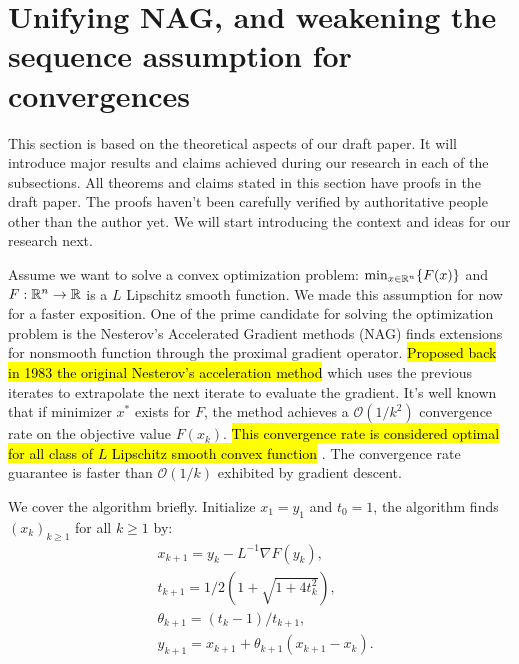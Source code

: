 \documentclass[12pt]{article}
\begin{document}
\section{Unifying NAG, and weakening the sequence assumption for convergences}\label{sec:unify-nes-acceleration}
    This section is based on the theoretical aspects of our draft paper. 
    It will introduce major results and claims achieved during our research in each of the subsections. 
    All theorems and claims stated in this section have proofs in the draft paper. 
    The proofs haven't been carefully verified by authoritative people other than the author yet. 
    We will start introducing the context and ideas for our research next. 
    \par
    Assume we want to solve a convex optimization problem: $\min_{x \in \mathbb R^n} \{F(x)\}$ and $F: \mathbb R^n \rightarrow \mathbb R$ is a $L$ Lipschitz smooth function. 
    We made this assumption for now for a faster exposition. 
    One of the prime candidate for solving the optimization problem is the Nesterov's Accelerated Gradient methods (NAG) finds extensions for nonsmooth function through the proximal gradient operator.
    {\hl{Proposed back in 1983 the original Nesterov's acceleration method}} \cite{nesterov_method_1983}
    which uses the previous iterates to extrapolate the next iterate to evaluate the gradient. 
    It's well known that if minimizer $x^*$ exists for $F$, the method achieves a $\mathcal O(1/k^2)$ convergence rate on the objective value $F(x_k)$. 
    {\hl{This convergence rate is considered optimal for all class of $L$ Lipschitz smooth convex function }}\cite{nesterov_lectures_2018}. 
    The convergence rate guarantee is faster than $\mathcal O(1/k)$ exhibited by gradient descent. 
    \par
    We cover the algorithm briefly. 
    Initialize $x_1 = y_1$ and $t_0 = 1$, the algorithm finds $(x_k)_{k \ge 1}$ for all $k \ge 1$ by: 
    \begin{align}\label{eqn:nag_example}
        & x_{k + 1} = y_k - L^{-1}\nabla F(y_k), 
        \\
        & t_{k + 1} = 1/2\left(1 + \sqrt{1 + 4t_{k}^2}\right), 
        \\
        & \theta_{k + 1} = (t_{k} - 1)/t_{k + 1}, 
        \\
        & y_{k + 1} = x_{k + 1} + \theta_{k + 1}(x_{k + 1} - x_k). 
    \end{align}
\end{document}
